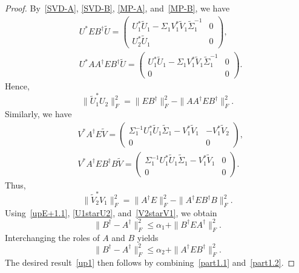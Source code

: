 \documentclass[11pt]{article}
\begin{document}
\begin{proof}
By~\eqref{SVD-A}, \eqref{SVD-B}, \eqref{MP-A}, and~\eqref{MP-B}, we have
\begin{align*}
&U^{\ast}EB^{\dagger}\widetilde{U}=\begin{pmatrix}
U_{1}^{\ast}\widetilde{U}_{1}-\Sigma_{1}V_{1}^{\ast}\widetilde{V}_{1}\widetilde{\Sigma}_{1}^{-1} & 0 \\
U_{2}^{\ast}\widetilde{U}_{1} & 0
\end{pmatrix},\\
&U^{\ast}AA^{\dagger}EB^{\dagger}\widetilde{U}=\begin{pmatrix}
U_{1}^{\ast}\widetilde{U}_{1}-\Sigma_{1}V_{1}^{\ast}\widetilde{V}_{1}\widetilde{\Sigma}_{1}^{-1} & 0 \\
0 & 0
\end{pmatrix}.
\end{align*}
Hence,
\begin{equation}\label{U1starU2}
\|\widetilde{U}_{1}^{\ast}U_{2}\|_{F}^{2}=\|EB^{\dagger}\|_{F}^{2}-\|AA^{\dagger}EB^{\dagger}\|_{F}^{2}.
\end{equation}
Similarly, we have
\begin{align*}
&V^{\ast}A^{\dagger}E\widetilde{V}=\begin{pmatrix}
\Sigma_{1}^{-1}U_{1}^{\ast}\widetilde{U}_{1}\widetilde{\Sigma}_{1}-V_{1}^{\ast}\widetilde{V}_{1} & -V_{1}^{\ast}\widetilde{V}_{2} \\
0 & 0
\end{pmatrix},\\
&V^{\ast}A^{\dagger}EB^{\dagger}B\widetilde{V}=\begin{pmatrix}
\Sigma_{1}^{-1}U_{1}^{\ast}\widetilde{U}_{1}\widetilde{\Sigma}_{1}-V_{1}^{\ast}\widetilde{V}_{1} & 0 \\
0 & 0
\end{pmatrix}.
\end{align*}
Thus,
\begin{equation}\label{V2starV1}
\|\widetilde{V}_{2}^{\ast}V_{1}\|_{F}^{2}=\|A^{\dagger}E\|_{F}^{2}-\|A^{\dagger}EB^{\dagger}B\|_{F}^{2}.
\end{equation}
Using~\eqref{upE+1.1}, \eqref{U1starU2}, and~\eqref{V2starV1}, we obtain
\begin{equation}\label{part1.1}
\|B^{\dagger}-A^{\dagger}\|_{F}^{2}\leq\alpha_{1}+\|B^{\dagger}EA^{\dagger}\|_{F}^{2}.
\end{equation}
Interchanging the roles of $A$ and $B$ yields
\begin{equation}\label{part1.2}
\|B^{\dagger}-A^{\dagger}\|_{F}^{2}\leq\alpha_{2}+\|A^{\dagger}EB^{\dagger}\|_{F}^{2}.
\end{equation}
The desired result~\eqref{up1} then follows by combining~\eqref{part1.1} and~\eqref{part1.2}.
\end{proof}
\end{document}
